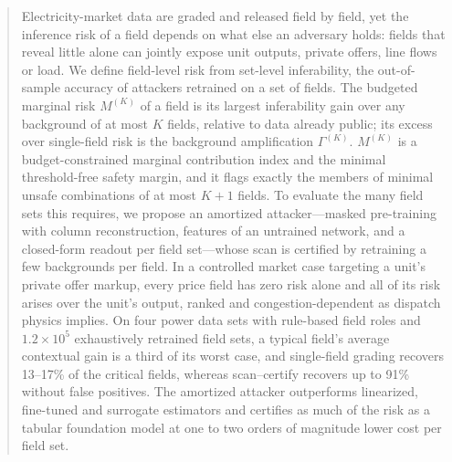 \begin{abstract}
Electricity-market data are graded and released field by field, yet the inference risk of a field depends on what else an
adversary holds: fields that reveal little alone can jointly expose unit outputs, private offers, line flows or load. We
define field-level risk from set-level inferability, the out-of-sample accuracy of attackers retrained on a set of fields.
The budgeted marginal risk $M^{(K)}$ of a field is its largest inferability gain over any background of at most $K$ fields,
relative to data already public; its excess over single-field risk is the background amplification $\Gamma^{(K)}$.
$M^{(K)}$ is a budget-constrained marginal contribution index and the minimal threshold-free safety margin, and it flags
exactly the members of minimal unsafe combinations of at most $K+1$ fields. To evaluate the many field sets this requires,
we propose an amortized attacker---masked pre-training with column reconstruction, features of an untrained network, and a
closed-form readout per field set---whose scan is certified by retraining a few backgrounds per field. In a controlled
market case targeting a unit's private offer markup, every price field has zero risk alone and all of its risk arises over
the unit's output, ranked and congestion-dependent as dispatch physics implies. On four power data sets with rule-based
field roles and $1.2\times10^5$ exhaustively retrained field sets, a typical field's average contextual gain is a third of
its worst case, and single-field grading recovers 13--17\% of the critical fields, whereas scan--certify recovers up to 91\%
without false positives. The amortized attacker outperforms linearized, fine-tuned and surrogate estimators and certifies as
much of the risk as a tabular foundation model at one to two orders of magnitude lower cost per field set.
\end{abstract}
